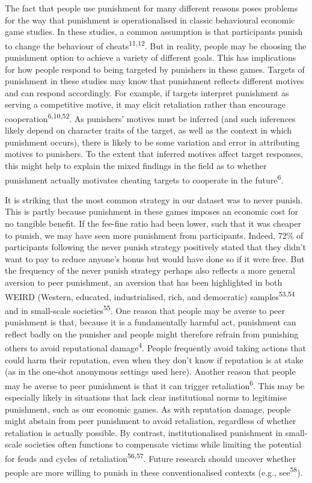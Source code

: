 \documentclass[
  man,floatsintext]{apa6}
\begin{document}
The fact that people use punishment for many different reasons poses problems
for the way that punishment is operationalised in classic behavioural economic
game studies. In these studies, a common assumption is that participants punish
to change the behaviour of cheats\textsuperscript{11,12}. But in reality, people
may be choosing the punishment option to achieve a variety of different goals.
This has implications for how people respond to being targeted by punishers in
these games. Targets of punishment in these studies may know that punishment
reflects different motives and can respond accordingly. For example, if targets
interpret punishment as serving a competitive motive, it may elicit retaliation
rather than encourage cooperation\textsuperscript{6,10,52}.
As punishers' motives must be inferred (and such inferences likely depend on
character traits of the target, as well as the context in which punishment
occurs), there is likely to be some variation and error in attributing motives
to punishers. To the extent that inferred motives affect target responses, this
might help to explain the mixed findings in the field as to whether punishment
actually motivates cheating targets to cooperate in the future\textsuperscript{6}.

It is striking that the most common strategy in our dataset was to never punish.
This is partly because punishment in these games imposes an economic cost for no
tangible benefit. If the fee-fine ratio had been lower, such that it was cheaper
to punish, we may have seen more punishment from participants. Indeed,
72\%
of participants following the never punish strategy positively stated that they
didn't want to pay to reduce anyone's bonus but would have done so if it were
free. But the frequency of the never punish strategy perhaps also reflects a
more general aversion to peer punishment, an aversion that has been highlighted
in both WEIRD (Western, educated, industrialised, rich, and democratic) samples\textsuperscript{53,54} and in small-scale societies\textsuperscript{55}.
One reason that people may be averse to peer punishment is that, because it is
a fundamentally harmful act, punishment can reflect badly on the punisher and
people might therefore refrain from punishing others to avoid reputational
damage\textsuperscript{4}. People frequently avoid taking actions that could harm
their reputation, even when they don't know if reputation is at stake (as in the
one-shot anonymous settings used here). Another reason that people may be averse
to peer punishment is that it can trigger retaliation\textsuperscript{6}. This may be
especially likely in situations that lack clear institutional norms to
legitimise punishment, such as our economic games. As with reputation damage,
people might abstain from peer punishment to avoid retaliation, regardless of
whether retaliation is actually possible. By contrast, institutionalised
punishment in small-scale societies often functions to compensate victims while
limiting the potential for feuds and cycles of retaliation\textsuperscript{56,57}. Future research should uncover whether people are
more willing to punish in these conventionalised contexts (e.g., see\textsuperscript{58}).
\end{document}
